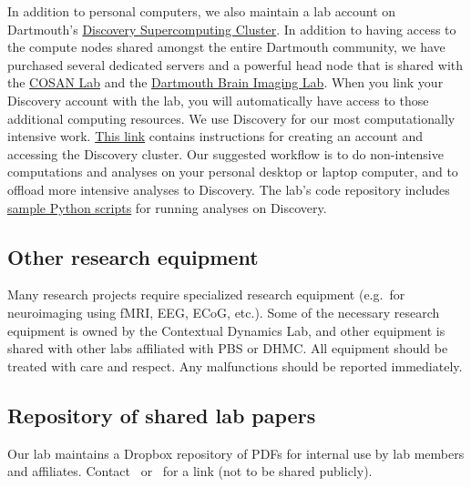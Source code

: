 \documentclass{tufte-book} %
\begin{document}
In addition to personal computers, we also maintain a lab account on
Dartmouth's \href{http://techdoc.dartmouth.edu/discovery/}{Discovery
  Supercomputing Cluster}.  In addition to having access to the
compute nodes shared amongst the entire Dartmouth community, we have
purchased several dedicated servers and a powerful head node that is
shared with the \href{http://www.cosanlab.com/}{COSAN Lab} and the
\href{http://www.dartmouth.edu/~bil/}{Dartmouth Brain Imaging Lab}.
When you link your Discovery account with the lab, you will
automatically have access to those additional computing resources.  We
use Discovery for our most computationally intensive work.
\href{https://trello-attachments.s3.amazonaws.com/56f548a3cb4847c27668e504/56f7ff07085632013a40545a/44c1921381d6193eca67e9c875a32960/discovery_cluster_tutorial.pdf}{This
  link} contains instructions for creating an account and accessing 	%
the Discovery cluster.  Our suggested workflow is to do non-intensive
computations and analyses on your personal desktop or laptop computer,
and to offload more intensive analyses to Discovery.  The lab's code
repository includes
\href{https://github.com/ContextLab/cluster-tools-dartmouth}{sample
  Python scripts} for running analyses on Discovery.

 \subsection{Other research equipment}
 Many research projects require specialized research equipment (e.g.\
 for neuroimaging using fMRI, EEG, ECoG, etc.).  Some of the necessary
 research equipment is owned by the Contextual Dynamics Lab, and other
 equipment is shared with other labs affiliated with PBS or DHMC.  All
 equipment should be treated with care and respect.  Any malfunctions
 should be reported immediately.

\subsection{Repository of shared lab papers}
Our lab maintains a Dropbox repository of PDFs for internal use by lab members and affiliates. Contact \director~or \coordinator~for a link (not to be shared publicly).
\end{document}
